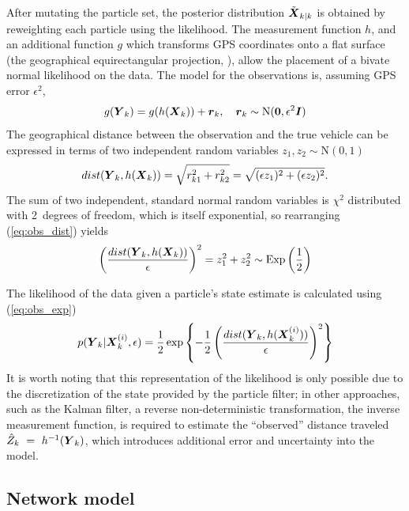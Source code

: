 After mutating the particle set, the posterior distribution $\tilde{\mbox{$\boldsymbol{X}$}}_{k|k}$ 
is obtained by reweighting each particle using the likelihood.
The measurement function $h$,
and an additional function $g$ which transforms GPS coordinates onto a flat
surface (the geographical equirectangular projection, \cite{Snyder_1998}),
allow the placement of a bivate normal likelihood on the data.
The model for the observations is,
assuming GPS error $\epsilon^2$,
\begin{equation}
\label{eq:pf_obs_model}
g(\mbox{$\boldsymbol{Y}$}_k) = g(h(\mbox{$\boldsymbol{X}$}_k)) + \boldsymbol{r}_k,
\quad \boldsymbol{r}_k \sim \mathrm{N}(\boldsymbol{0}, \epsilon^2\boldsymbol{I})
\end{equation}
The geographical distance between the observation and the true vehicle can be expressed
in terms of two independent random variables $z_1, z_2 \sim \mathrm{N}(0,1)$
\begin{equation}
\label{eq:obs_dist}
dist(\mbox{$\boldsymbol{Y}$}_k, h(\mbox{$\boldsymbol{X}$}_k)) = \sqrt{r_{k1}^2 + r_{k2}^2} 
    = \sqrt{(\epsilon z_1)^2 + (\epsilon z_2)^2}.
\end{equation}
The sum of two independent, standard normal random variables 
is $\chi^2$ distributed with 2~degrees of freedom,
which is itself exponential,
so rearranging (\ref{eq:obs_dist}) yields
\begin{equation}
\label{eq:obs_exp}
\left(\frac{dist(\mbox{$\boldsymbol{Y}$}_k, h(\mbox{$\boldsymbol{X}$}_k))}{\epsilon}\right)^2 =
z_1^2 + z_2^2 \sim \mathrm{Exp}\left(\frac{1}{2}\right)
\end{equation}

The likelihood of the data given a particle's state estimate 
is calculated using (\ref{eq:obs_exp})
\begin{equation}
p(\mbox{$\boldsymbol{Y}$}_k | \mbox{$\boldsymbol{X}$}_k^{(i)}, \epsilon) =
\frac{1}{2}\exp\left\{
-\frac{1}{2} \left(\frac{dist(\mbox{$\boldsymbol{Y}$}_k, h(\mbox{$\boldsymbol{X}$}_k^{(i)}))}{\epsilon}\right)^2
\right\}
\end{equation}
It is worth noting that this representation of the likelihood is only
possible due to the discretization of the state provided by the particle filter;
in other approaches, such as the Kalman filter,
a reverse non-deterministic transformation,
the inverse measurement function,
is required to estimate the ``observed'' distance traveled $\hat Z_k~=~h^{-1}(\mbox{$\boldsymbol{Y}$}_k)$, 
which introduces additional error and uncertainty into the model.



\subsection{Network model}
\label{sec:kf}

